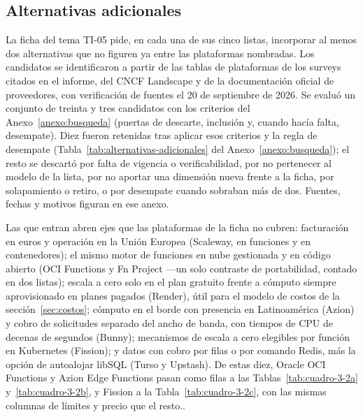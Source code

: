 \documentclass[12pt, letterpaper, table, xcdraw]{inf-pucv}
\begin{document}
\subsection{Alternativas adicionales}
\label{sec:alternativas}


La ficha del tema TI-05 \parencite{moya2026indicaciones} pide, en cada una de sus cinco listas, incorporar al menos dos alternativas que no figuren ya entre las plataformas nombradas. Los candidatos se identificaron a partir de las tablas de plataformas de los surveys citados en el informe, del CNCF Landscape y de la documentación oficial de proveedores, con verificación de fuentes el 20 de septiembre de 2026. Se evaluó un conjunto de treinta y tres candidatos con los criterios del Anexo~\ref{anexo:busqueda} (puertas de descarte, inclusión y, cuando hacía falta, desempate). Diez fueron retenidas tras aplicar esos criterios y la regla de desempate (Tabla~\ref{tab:alternativas-adicionales} del Anexo~\ref{anexo:busqueda}); el resto se descartó por falta de vigencia o verificabilidad, por no pertenecer al modelo de la lista, por no aportar una dimensión nueva frente a la ficha, por solapamiento o retiro, o por desempate cuando sobraban más de dos. Fuentes, fechas y motivos figuran en ese anexo.

Las que entran abren ejes que las plataformas de la ficha no cubren: facturación en euros y operación en la Unión Europea (Scaleway, en funciones y en contenedores); el mismo motor de funciones en nube gestionada y en código abierto (OCI Functions y Fn Project ---un solo contraste de portabilidad, contado en dos listas); escala a cero solo en el plan gratuito frente a cómputo siempre aprovisionado en planes pagados (Render), útil para el modelo de costos de la sección~\ref{sec:costos}; cómputo en el borde con presencia en Latinoamérica (Azion) y cobro de solicitudes separado del ancho de banda, con tiempos de CPU de decenas de segundos (Bunny); mecanismos de escala a cero elegibles por función en Kubernetes (Fission); y datos con cobro por filas o por comando Redis, más la opción de autoalojar libSQL (Turso y Upstash). De estas diez, Oracle OCI Functions y Azion Edge Functions pasan como filas a las Tablas~\ref{tab:cuadro-3-2a} y~\ref{tab:cuadro-3-2b}, y Fission a la Tabla~\ref{tab:cuadro-3-2c}, con las mismas columnas de límites y precio que el resto..
\end{document}
